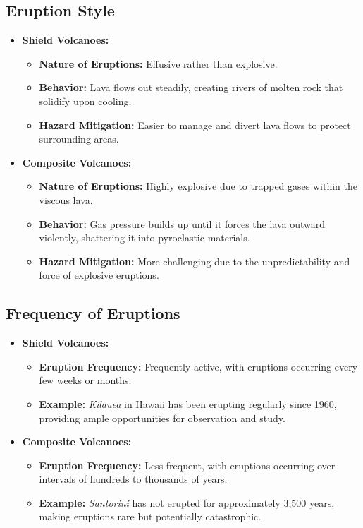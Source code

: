 \documentclass{article}
\begin{document}
\subsection{Eruption Style}
\begin{itemize}[leftmargin=*, label={--}]
    \item \textbf{Shield Volcanoes:}
    \begin{itemize}[leftmargin=*, label={$\bullet$}]
        \item \textbf{Nature of Eruptions:} Effusive rather than explosive.
        \item \textbf{Behavior:} Lava flows out steadily, creating rivers of molten rock that solidify upon cooling.
        \item \textbf{Hazard Mitigation:} Easier to manage and divert lava flows to protect surrounding areas.
    \end{itemize}
    
    \item \textbf{Composite Volcanoes:}
    \begin{itemize}[leftmargin=*, label={$\bullet$}]
        \item \textbf{Nature of Eruptions:} Highly explosive due to trapped gases within the viscous lava.
        \item \textbf{Behavior:} Gas pressure builds up until it forces the lava outward violently, shattering it into pyroclastic materials.
        \item \textbf{Hazard Mitigation:} More challenging due to the unpredictability and force of explosive eruptions.
    \end{itemize}
\end{itemize}

\subsection{Frequency of Eruptions}
\begin{itemize}[leftmargin=*, label={--}]
    \item \textbf{Shield Volcanoes:}
    \begin{itemize}[leftmargin=*, label={$\bullet$}]
        \item \textbf{Eruption Frequency:} Frequently active, with eruptions occurring every few weeks or months.
        \item \textbf{Example:} \textit{Kilauea} in Hawaii has been erupting regularly since 1960, providing ample opportunities for observation and study.
    \end{itemize}
    
    \item \textbf{Composite Volcanoes:}
    \begin{itemize}[leftmargin=*, label={$\bullet$}]
        \item \textbf{Eruption Frequency:} Less frequent, with eruptions occurring over intervals of hundreds to thousands of years.
        \item \textbf{Example:} \textit{Santorini} has not erupted for approximately 3,500 years, making eruptions rare but potentially catastrophic.
    \end{itemize}
\end{itemize}
\end{document}
